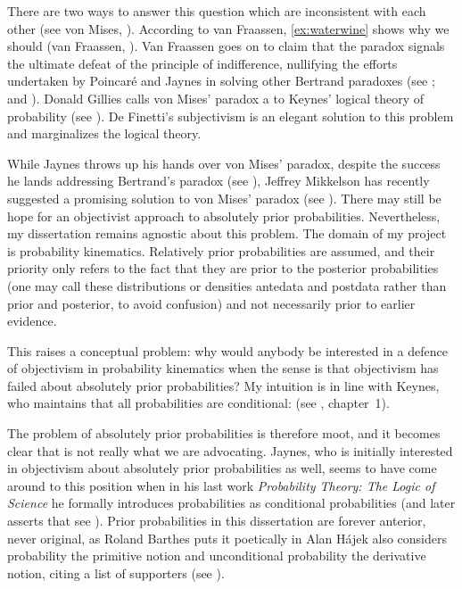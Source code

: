 \documentclass[phd,12pt,oneside]{ubcthesis}
\begin{document}
There are two ways to answer this question which are inconsistent with
each other (see von Mises, ). According to van
Fraassen, {\xample} \ref{ex:waterwine} shows why we should
(van Fraassen, ). Van Fraassen goes on to
claim that the paradox signals the ultimate defeat of the principle of
indifference, nullifying the efforts undertaken by Poincar{\'e} and
Jaynes in solving other Bertrand paradoxes (see
; and ). Donald
Gillies calls von Mises' paradox a  to Keynes' logical theory of probability (see
). De Finetti's subjectivism is an elegant
solution to this problem and marginalizes the logical theory.

While Jaynes throws up his hands over von Mises' paradox, despite the
success he lands addressing Bertrand's paradox (see
), Jeffrey Mikkelson has recently suggested a
promising solution to von Mises' paradox (see
). There may still be hope for an objectivist
approach to absolutely prior probabilities. Nevertheless, my dissertation
remains agnostic about this problem. The domain of my project is
probability kinematics. Relatively prior probabilities are assumed,
and their priority only refers to the fact that they are prior to the
posterior probabilities (one may call these distributions or densities
antedata and postdata rather than prior and posterior, to avoid
confusion) and not necessarily prior to earlier evidence.

This raises a conceptual problem: why would anybody be interested in a
defence of objectivism in probability kinematics when the sense is
that objectivism has failed about absolutely prior probabilities? My
intuition is in line with Keynes, who maintains that all probabilities
are conditional:  (see
, chapter~1).

The problem of absolutely prior probabilities is therefore moot, and
it becomes clear that  is not really what we are
advocating. Jaynes, who is initially interested in objectivism about
absolutely prior probabilities as well, seems to have come around to
this position when in his last work \emph{Probability Theory: The
  Logic of Science} he formally introduces probabilities as
conditional probabilities (and later asserts that  see
). Prior probabilities in this
dissertation are forever anterior, never original, as Roland Barthes
puts it poetically in  Alan H{\'a}jek
also considers probability the primitive notion and unconditional
probability the derivative notion, citing a list of supporters (see
).
\end{document}
